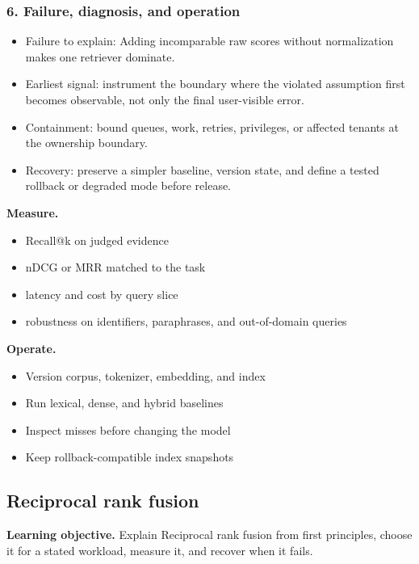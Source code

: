 \subsubsection*{6. Failure, diagnosis, and operation}
\begin{itemize}
\item Failure to explain: Adding incomparable raw scores without normalization makes one retriever dominate.
\item Earliest signal: instrument the boundary where the violated assumption first becomes observable, not only the final user-visible error.
\item Containment: bound queues, work, retries, privileges, or affected tenants at the ownership boundary.
\item Recovery: preserve a simpler baseline, version state, and define a tested rollback or degraded mode before release.
\end{itemize}
\textbf{Measure.}\begin{itemize}
\item Recall@k on judged evidence
\item nDCG or MRR matched to the task
\item latency and cost by query slice
\item robustness on identifiers, paraphrases, and out-of-domain queries
\end{itemize}
\textbf{Operate.}\begin{itemize}
\item Version corpus, tokenizer, embedding, and index
\item Run lexical, dense, and hybrid baselines
\item Inspect misses before changing the model
\item Keep rollback-compatible index snapshots
\end{itemize}
\subsection{Reciprocal rank fusion}
\textbf{Learning objective.} Explain Reciprocal rank fusion from first principles, choose it for a stated workload, measure it, and recover when it fails.
